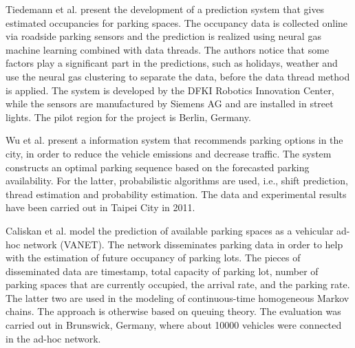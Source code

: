 
Tiedemann et al. \cite{tiedemann} present the development of a prediction system that gives estimated occupancies for parking spaces. The occupancy data is collected online via roadside parking sensors and the prediction is realized using neural gas machine learning combined with data threads. The authors notice that some factors play a significant part in the predictions, such as holidays, weather and use the neural gas clustering to separate the data, before the data thread method is applied.
The system is developed by the DFKI Robotics Innovation Center, while the sensors are manufactured by Siemens AG and are installed in street lights. The pilot region for the project is Berlin, Germany.


Wu et al. \cite{wu} present a information system that recommends parking options in the city, in order to reduce the vehicle emissions and decrease traffic. The system constructs an optimal parking sequence based on the forecasted parking availability. For the latter, probabilistic algorithms are used, i.e., shift prediction, thread estimation and probability estimation. The data and experimental results have been carried out in Taipei City in 2011.

Caliskan et al. \cite{caliskan} model the prediction of available parking spaces as a vehicular ad-hoc network (VANET). The network disseminates parking data in order to help with the estimation of future occupancy of parking lots. The pieces of disseminated data are timestamp, total capacity of parking lot, number of parking spaces that are currently occupied, the arrival rate, and the parking rate. The latter two are used in the modeling of continuous-time homogeneous Markov chains. The approach is otherwise based on queuing theory. The evaluation was carried out in Brunswick, Germany, where about 10000 vehicles were connected in the ad-hoc network. 

